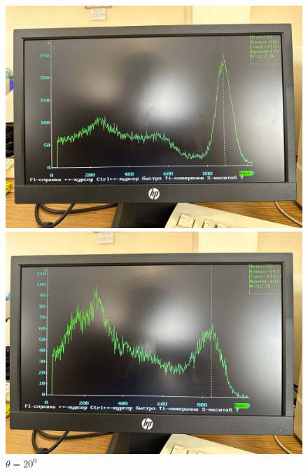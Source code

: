 \documentclass[a4paper, 12pt]{article}
\begin{document}
    \begin{figure}[H]
    \begin{minipage}[h]{0.3\linewidth}
        \includegraphics[width = 1\linewidth]{res/02.jpg}
        \caption{$\theta = 10^0$}
    \end{minipage}
    \hfill
    \begin{minipage}[h]{0.3\linewidth}
        \includegraphics[width = 1\linewidth]{res/03.jpg}
        \caption{$\theta = 20^0$}
    \end{minipage}
    \hfill
    \begin{minipage}[h]{0.3\linewidth}

\end{minipage}
\end{figure}
\end{document}
